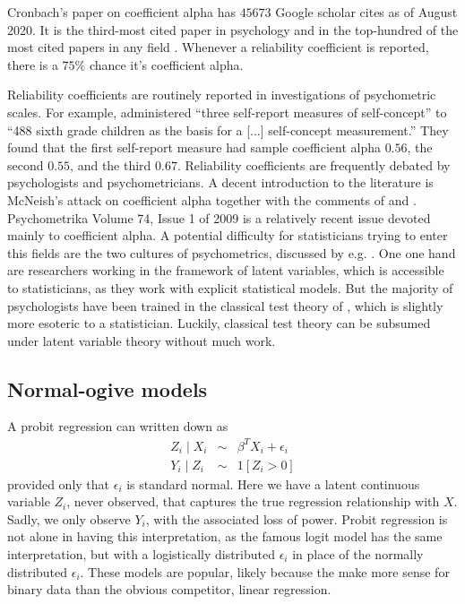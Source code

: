 Cronbach's \citeyear{Cronbach1951-in} paper on coefficient alpha has $45673$ Google scholar cites as of August 2020. It is the third-most cited paper in psychology and in the top-hundred of the most cited papers in any field \parencite{McNeish2018-vu}. Whenever a reliability coefficient is reported, there is a $75\%$ chance it's coefficient alpha.

Reliability coefficients are routinely reported in investigations of psychometric scales. For example, \textcite{Marx1978-rf} administered \enquote{three self-report measures of self-concept} to \enquote{488 sixth grade children as the basis for a [...] self-concept measurement.} They found that the first self-report measure had sample coefficient alpha $0.56$, the second $0.55$, and the third $0.67$. 
Reliability coefficients are frequently debated by psychologists and psychometricians. A decent introduction to the literature is McNeish's \citeyear{McNeish2018-vu} attack on coefficient alpha together with the comments of \textcite{Raykov2019-yr} and \textcite{Savalei2019-se}. Psychometrika Volume 74, Issue 1 of 2009 is a relatively recent issue devoted mainly to coefficient alpha. A potential difficulty for statisticians trying to enter this fields are the two cultures of psychometrics, discussed by e.g. \textcite{Borsboom2005-iq}. One one hand are researchers working in the framework of latent variables, which is accessible to statisticians, as they work with explicit statistical models. But the majority of psychologists have been trained in the classical test theory of \textcite{Lord1968-ax}, which is slightly more esoteric to a statistician. Luckily, classical test theory can be subsumed under latent variable theory without much work.

\subsection{Normal-ogive models}
\label{subsec:Normal-ogive models}

A probit regression can written down as
\begin{eqnarray*}
Z_{i}\mid X_{i} & \sim & \beta^{T}X_{i}+\epsilon_{i}\\
Y_{i}\mid Z_{i} & \sim & 1[Z_{i}>0]
\end{eqnarray*}
provided only that $\epsilon_i$ is standard normal. Here we have a latent continuous variable $Z_i$, never observed, that captures the true regression relationship with $X$. Sadly, we only observe $Y_i$, with the associated loss of power. Probit regression is not alone in having this interpretation, as the famous logit model has the same interpretation, but with a logistically distributed $\epsilon_i$ in place of the normally distributed $\epsilon_i$. These models are popular, likely because the make more sense for binary data than the obvious competitor, linear regression.

